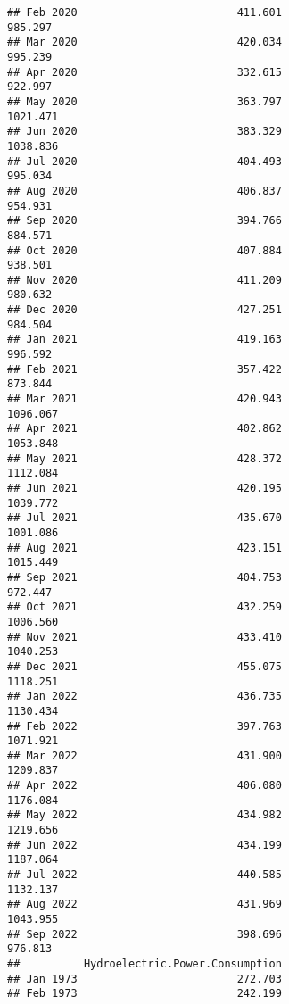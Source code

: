 \documentclass[
]{article}
\begin{document}
\begin{verbatim}
## Feb 2020                         411.601                           985.297
## Mar 2020                         420.034                           995.239
## Apr 2020                         332.615                           922.997
## May 2020                         363.797                          1021.471
## Jun 2020                         383.329                          1038.836
## Jul 2020                         404.493                           995.034
## Aug 2020                         406.837                           954.931
## Sep 2020                         394.766                           884.571
## Oct 2020                         407.884                           938.501
## Nov 2020                         411.209                           980.632
## Dec 2020                         427.251                           984.504
## Jan 2021                         419.163                           996.592
## Feb 2021                         357.422                           873.844
## Mar 2021                         420.943                          1096.067
## Apr 2021                         402.862                          1053.848
## May 2021                         428.372                          1112.084
## Jun 2021                         420.195                          1039.772
## Jul 2021                         435.670                          1001.086
## Aug 2021                         423.151                          1015.449
## Sep 2021                         404.753                           972.447
## Oct 2021                         432.259                          1006.560
## Nov 2021                         433.410                          1040.253
## Dec 2021                         455.075                          1118.251
## Jan 2022                         436.735                          1130.434
## Feb 2022                         397.763                          1071.921
## Mar 2022                         431.900                          1209.837
## Apr 2022                         406.080                          1176.084
## May 2022                         434.982                          1219.656
## Jun 2022                         434.199                          1187.064
## Jul 2022                         440.585                          1132.137
## Aug 2022                         431.969                          1043.955
## Sep 2022                         398.696                           976.813
##          Hydroelectric.Power.Consumption
## Jan 1973                         272.703
## Feb 1973                         242.199

\end{verbatim}
\end{document}
